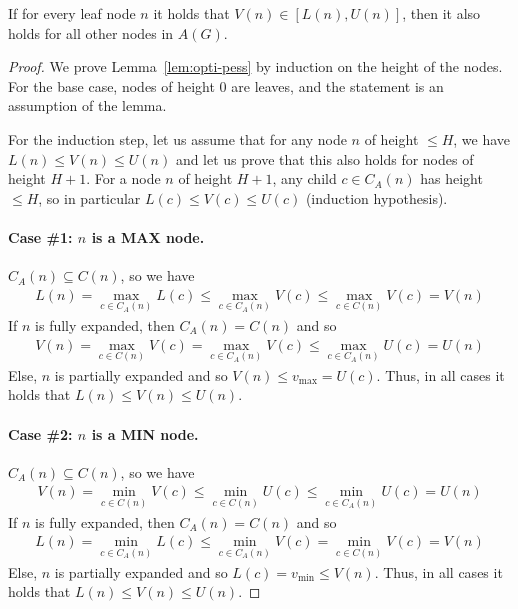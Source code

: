 \documentclass[runningheads]{llncs}
\newcommand{\MM}{\mathit{V}}
\newcommand{\pess}{\mathit{L}}
\newcommand{\opti}{\mathit{U}}
\newcommand{\vmax}{v_{\text{max}}}
\newcommand{\vmin}{v_{\text{min}}}
\begin{document}
\begin{lemma}
  If for every leaf node $n$ it holds that $\MM(n)\in [\pess(n), \opti(n)]$, then it also holds for all other nodes in $A(G)$.
\label{lem:opti-pess}
\end{lemma}
\begin{proof}
We prove Lemma~\ref{lem:opti-pess} by induction on the height of the nodes. For the base case, nodes of height 0 are leaves, and the statement is an assumption of the lemma.

For the induction step, let us assume that for any node $n$ of height $\leq H$, we have $\pess(n)\!\leq\! \MM(n)\!\leq\! \opti(n)$ and let us prove that this also holds for nodes of height $H+1$.
For a node $n$ of height $H+1$, any child $c \in C_A(n)$ has height $\leq H$, so in particular $\pess(c)\!\leq\!\MM(c)\!\leq\!\opti(c)$ (induction hypothesis).

\paragraph{Case \#1: $n$ is a MAX node.}
$C_A(n) \subseteq C(n)$, so we have
\begin{align}
  \pess(n) = \!\!\!\!\max_{c\in C_A(n)} \!\!\!\!\pess(c) \leq \!\!\!\!\max_{c\in C_A(n)} \!\!\!\!\MM(c) \leq \!\!\!\!\max_{c\in C(n)} \!\!\!\! \MM(c) \! = \!\!\MM(n)
\end{align}
If $n$ is fully expanded, then $C_A(n)=C(n)$ and so
\begin{align}
  \MM(n) \!= \!\!\!\max_{c \in C(n)} \!\!\!\!\MM(c) \!= \!\!\!\!\max_{c \in C_A(n)} \!\!\!\!\MM(c) \leq \!\!\!\!\max_{c \in C_A(n)} \!\!\!\!\opti(c) \!= \!\!\opti(n)
\end{align}
Else, $n$ is partially expanded and so $\MM(n) \leq \vmax = \opti(c)$.
Thus, in all cases it holds that $\pess(n) \leq \MM(n) \leq \opti(n)$.


\paragraph{Case \#2: $n$ is a MIN node.}
$C_A(n) \subseteq C(n)$, so we have
\begin{align}
  \MM(n) \!= \!\!\!\!\min_{c\in C(n)} \!\!\!\!\MM(c) \leq \!\!\!\!\min_{c\in C(n)} \!\!\!\!\opti(c) \leq \!\!\!\!\min_{c \in C_A(n)} \!\!\!\! \opti(c) \! = \! \opti(n)
\end{align}
If $n$ is fully expanded, then $C_A(n)=C(n)$ and so
\begin{align}
  \pess(n) \! = \!\!\!\!\min_{c \in C_A(n)} \!\!\!\!\pess(c) \leq \!\!\!\!\min_{c \in C_A(n)} \!\!\!\!\MM(c) = \!\!\!\!\min_{c \in C(n)} \!\!\!\!\MM(c) \!=\! \MM(n)
\end{align}
Else, $n$ is partially expanded and so $\pess(c) = \vmin\leq \MM(n)$. 
Thus, in all cases it holds that $\pess(n) \leq \MM(n) \leq \opti(n)$.


\end{proof}
\end{document}
